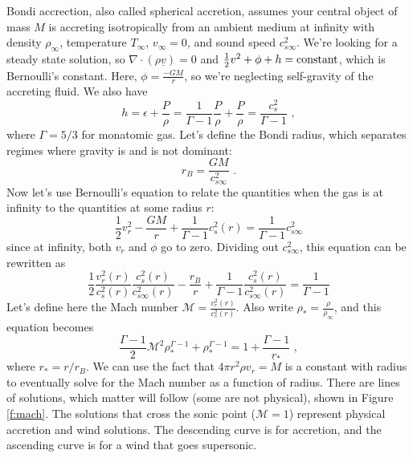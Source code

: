 Bondi accrection, also called spherical accretion, assumes your central object of mass $M$ is accreting isotropically from an ambient medium at infinity with density $\rho_\infty$, temperature $T_\infty$, $v_\infty = 0$, and sound speed $c_{s\infty}^2$. We're looking for a steady state solution, so $\nabla \cdot (\rho \underline{v}) = 0$ and $\frac{1}{2} v^2 + \phi + h = {\rm constant}$, which is Bernoulli's constant. Here, $\phi = \frac{-G M}{r}$, so we're neglecting self-gravity of the accreting fluid. We also have
\begin{equation}
h = \epsilon + \frac{P}{\rho} = \frac{1}{\Gamma - 1}\frac{P}{\rho} + \frac{P}{\rho} = \frac{c_s^2}{\Gamma - 1}\,\, ,
\end{equation}
where $\Gamma = 5/3$ for monatomic gas. Let's define the Bondi radius, which separates regimes where gravity is and is not dominant:
\begin{equation}
r_B = \frac{G M}{c_{s \infty}^2} \,\,.
\end{equation}
Now let's use Bernoulli's equation to relate the quantities when the gas is at infinity to the quantities at some radius $r$:
\begin{equation}
\frac{1}{2} v_r^2 - \frac{G M}{r} + \frac{1}{\Gamma - 1} c_s^2(r) = \frac{1}{\Gamma - 1} c_{s \infty}^2
\end{equation}
since at infinity, both $v_r$ and $\phi$ go to zero. Dividing out $c_{s \infty}^2$, this equation can be rewritten as 
\begin{equation}
\frac{1}{2}\frac{v_r^2(r)}{c_s^2(r)}\frac{c_s^2(r)}{c_{s \infty}^2(r)} - \frac{r_B}{r} + \frac{1}{\Gamma - 1}\frac{c_s^2(r)}{c_{s \infty}^2(r)} = \frac{1}{\Gamma - 1}
\end{equation}
Let's define here the Mach number $\mathcal{M} = \frac{v_r^2(r)}{c_s^2(r)}$. Also write $\rho_* = \frac{\rho}{\rho_\infty}$, and this equation becomes
\begin{equation}
\frac{\Gamma - 1}{2}\mathcal{M}^2 \rho_*^{\Gamma - 1} + \rho_*^{\Gamma - 1} = 1 + \frac{\Gamma - 1}{r_*}\,\, ,
\end{equation}
where $r_* = r/r_B$. We can use the fact that $4 \pi r^2 \rho v_r = \dot{M}$ is a constant with radius to eventually solve for the Mach number as a function of radius. There are lines of solutions, which matter will follow (some are not physical), shown in Figure \ref{f:mach}. The solutions that cross the sonic point ($\mathcal{M} = 1$) represent physical accretion and wind solutions. The descending curve is for accretion, and the ascending curve is for a wind that goes supersonic.

